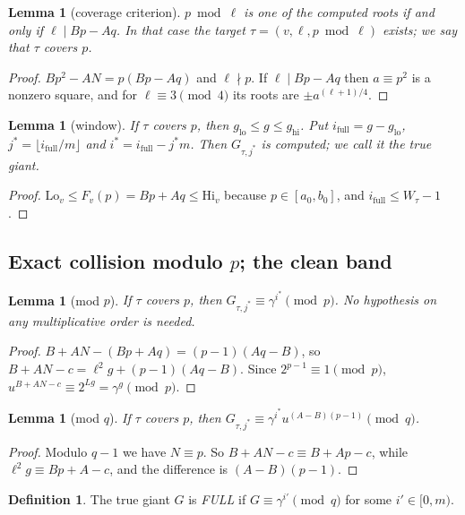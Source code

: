 \documentclass[11pt]{amsart}
\newtheorem{lemma}[theorem]{Lemma}
\theoremstyle{definition}
\newtheorem{definition}[theorem]{Definition}
\begin{document}
\begin{lemma}[coverage criterion]\label{lem:coverage}
$p\bmod\ell$ is one of the computed roots if and only if $\ell\mid Bp-Aq$. In that case the
target $\tau=(v,\ell,p\bmod\ell)$ exists; we say that $\tau$ \emph{covers} $p$.
\end{lemma}
\begin{proof}
$Bp^2-AN=p(Bp-Aq)$ and $\ell\nmid p$. If $\ell\mid Bp-Aq$ then $a\equiv p^2$ is a nonzero
square, and for $\ell\equiv3\pmod4$ its roots are $\pm a^{(\ell+1)/4}$.
\end{proof}

\begin{lemma}[window]\label{lem:window}
If $\tau$ covers $p$, then $g_{\mathrm{lo}}\le g\le g_{\mathrm{hi}}$. Put
$i_{\mathrm{full}}=g-g_{\mathrm{lo}}$, $j^*=\lfloor i_{\mathrm{full}}/m\rfloor$ and
$i^*=i_{\mathrm{full}}-j^*m$. Then $G_{\tau,j^*}$ is computed; we call it the \emph{true
giant}.
\end{lemma}
\begin{proof}
$\mathrm{Lo}_v\le F_v(p)=Bp+Aq\le\mathrm{Hi}_v$ because $p\in[a_0,b_0]$, and
$i_{\mathrm{full}}\le W_\tau-1$.
\end{proof}

\subsection{Exact collision modulo \texorpdfstring{$p$}{p}; the clean band}

\begin{lemma}[mod $p$]\label{lem:modp}
If $\tau$ covers $p$, then $G_{\tau,j^*}\equiv\gamma^{i^*}\pmod p$. No hypothesis on any
multiplicative order is needed.
\end{lemma}
\begin{proof}
$B+AN-(Bp+Aq)=(p-1)(Aq-B)$, so $B+AN-c=\ell^2g+(p-1)(Aq-B)$. Since $2^{p-1}\equiv1\pmod p$,
$u^{B+AN-c}\equiv2^{L g}=\gamma^g\pmod p$.
\end{proof}

\begin{lemma}[mod $q$]\label{lem:modq}
If $\tau$ covers $p$, then $G_{\tau,j^*}\equiv\gamma^{i^*}u^{(A-B)(p-1)}\pmod q$.
\end{lemma}
\begin{proof}
Modulo $q-1$ we have $N\equiv p$. So $B+AN-c\equiv B+Ap-c$, while $\ell^2g\equiv Bp+A-c$, and
the difference is $(A-B)(p-1)$.
\end{proof}

\begin{definition}
The true giant $G$ is \emph{FULL} if $G\equiv\gamma^{i'}\pmod q$ for some $i'\in[0,m)$.
\end{definition}
\end{document}
